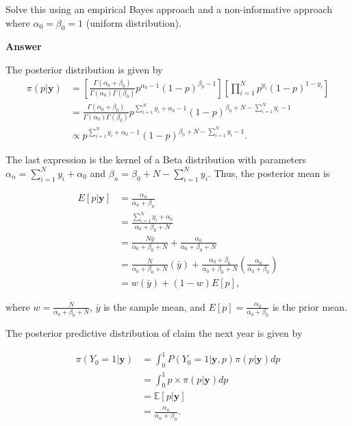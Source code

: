 \begin{enumerate}[leftmargin=*]
Solve this using an empirical Bayes approach and a non-informative approach where $\alpha_0=\beta_0=1$ (uniform distribution).

\textbf{Answer}

The posterior distribution is given by
	\begin{align}
		\pi\left( p | \textbf{y}\right) & = \left[ \frac{\Gamma\left( \alpha_0 + \beta_0\right) }{\Gamma\left( \alpha_0\right) \Gamma\left( \beta_0\right) } p^{\alpha_0 - 1} \left( 1 - p \right)^{\beta_0 - 1} \right] \left[ \prod_{i = 1}^{N} p^{y_i} \left( 1 - p\right)^{1 - y_i} \right]  \\
		& = \frac{\Gamma\left( \alpha_0 + \beta_0\right) }{\Gamma\left( \alpha_0\right) \Gamma\left( \beta_0\right) } p^{\sum_{i = 1}^{N} y_i + \alpha_0 - 1} \left( 1 - p\right)^{\beta_0 + N - \sum_{i = 1}^{N} y_i - 1} \nonumber \\
		& \propto  p^{\sum_{i = 1}^{N} y_i + \alpha_0 - 1} \left( 1 - p\right)^{\beta_0 + N - \sum_{i = 1}^{N} y_i - 1}. \nonumber
	\end{align}
	
	The last expression is the kernel of a Beta distribution with parameters $\alpha_n = \sum_{i = 1}^{N} y_i + \alpha_0$ and $\beta_n = \beta_0 + N - \sum_{i = 1}^{N} y_i$. Thus, the posterior mean is 
	
	\begin{align}
		E\left[ p | \textbf{y}\right] & = \frac{\alpha_n}{\alpha_n + \beta_n} \nonumber \\
		& = \frac{\sum_{i = 1}^{N} y_i + \alpha_0}{\alpha_0 + \beta_0 + N} \\
		& = \frac{N \bar{y}}{\alpha_0 + \beta_0 + N} + \frac{\alpha_0}{\alpha_0 + \beta_0 + N} \nonumber \\
		& = \frac{N}{\alpha_0 + \beta_0 + N} \left( \bar{y} \right) + \frac{\alpha_0 + \beta_0}{\alpha_0 + \beta_0 + N} \left( \frac{\alpha_0}{\alpha_0 + \beta_0}\right) \nonumber \\
		& = w \left( \bar{y}\right) + (1 - w) E\left[ p \right], \nonumber  
	\end{align}
	
	where $w = \frac{N}{\alpha_0 + \beta_0 + N}$, $\bar{y}$ is the sample mean, and $E\left[ p \right]  = \frac{\alpha_0}{\alpha_0 + \beta_0}$ is the prior mean.
	
	The posterior predictive distribution of claim the next year is given by
	
	\begin{align}
		\pi(Y_0 = 1| \textbf{y}) & = \int_{0}^{1}  P(Y_0 = 1| \textbf{y}, p) \pi\left( p | \textbf{y}\right) dp \nonumber \\
		& = \int_{0}^{1}  p  \times \pi\left( p | \textbf{y}\right) dp \nonumber \\
		& =  \mathbb{E}\left[ p | \textbf{y} \right]   \nonumber \\
		& =  \frac{\alpha_n}{\alpha_n + \beta_n}.
	\end{align}
	

\end{enumerate}
